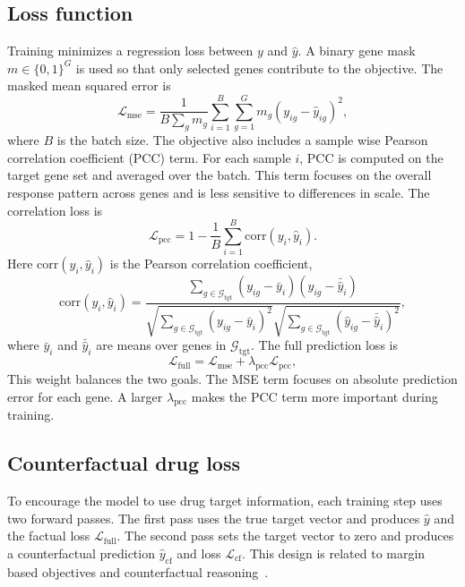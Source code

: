 \subsection{Loss function}
Training minimizes a regression loss between $y$ and $\hat{y}$. A binary gene mask $m\in\{0,1\}^{G}$ is used so that only selected genes contribute to the objective. The masked mean squared error is
\begin{equation}
\mathcal{L}_{\mathrm{mse}}=\frac{1}{B\sum_{g} m_{g}}\sum_{i=1}^{B}\sum_{g=1}^{G} m_{g}\left(y_{ig}-\hat{y}_{ig}\right)^{2},
\end{equation}
where $B$ is the batch size.
The objective also includes a sample wise Pearson correlation coefficient (PCC) term. For each sample $i$, PCC is computed on the target gene set and averaged over the batch. This term focuses on the overall response pattern across genes and is less sensitive to differences in scale. The correlation loss is
\begin{equation}
\mathcal{L}_{\mathrm{pcc}} = 1-\frac{1}{B}\sum_{i=1}^{B}\mathrm{corr}\!\left(y_{i},\hat{y}_{i}\right).
\end{equation}
Here $\mathrm{corr}(y_{i},\hat{y}_{i})$ is the Pearson correlation coefficient,
\begin{equation}
\mathrm{corr}(y_{i},\hat{y}_{i})=\frac{\sum_{g\in\mathcal{G}_{\mathrm{tgt}}}\left(y_{ig}-\bar{y}_{i}\right)\left(\hat{y}_{ig}-\bar{\hat{y}}_{i}\right)}{\sqrt{\sum_{g\in\mathcal{G}_{\mathrm{tgt}}}\left(y_{ig}-\bar{y}_{i}\right)^{2}}\sqrt{\sum_{g\in\mathcal{G}_{\mathrm{tgt}}}\left(\hat{y}_{ig}-\bar{\hat{y}}_{i}\right)^{2}}},
\end{equation}
where $\bar{y}_{i}$ and $\bar{\hat{y}}_{i}$ are means over genes in $\mathcal{G}_{\mathrm{tgt}}$.
The full prediction loss is
\begin{equation}
\mathcal{L}_{\mathrm{full}}=\mathcal{L}_{\mathrm{mse}}+\lambda_{\mathrm{pcc}}\mathcal{L}_{\mathrm{pcc}},
\end{equation}
This weight balances the two goals. The MSE term focuses on absolute prediction error for each gene. A larger $\lambda_{\mathrm{pcc}}$ makes the PCC term more important during training.

\subsection{Counterfactual drug loss}
To encourage the model to use drug target information, each training step uses two forward passes. The first pass uses the true target vector and produces $\hat{y}$ and the factual loss $\mathcal{L}_{\mathrm{full}}$. The second pass sets the target vector to zero and produces a counterfactual prediction $\hat{y}_{\mathrm{cf}}$ and loss $\mathcal{L}_{\mathrm{cf}}$. This design is related to margin based objectives and counterfactual reasoning~\cite{hadsell2006contrastive, schroff2015facenet, wachter2017counterfactual}.

